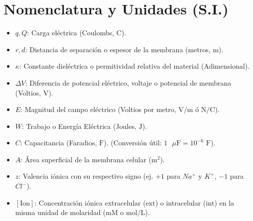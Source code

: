 \documentclass[11pt,letterpaper]{article}
\begin{document}
\section*{Nomenclatura y Unidades (S.I.)}
\begin{itemize}
    \item $q, Q$: Carga eléctrica (Coulombs, $\text{C}$).
    \item $r, d$: Distancia de separación o espesor de la membrana (metros, $\text{m}$).
    \item $\kappa$: Constante dieléctrica o permitividad relativa del material (Adimensional).
    \item $\Delta V$: Diferencia de potencial eléctrico, voltaje o potencial de membrana (Voltios, $\text{V}$).
    \item $E$: Magnitud del campo eléctrico (Voltios por metro, $\text{V/m}$ ó $\text{N/C}$).
    \item $W$: Trabajo o Energía Eléctrica (Joules, $\text{J}$).
    \item $C$: Capacitancia (Faradios, $\text{F}$). (Conversión útil: $1 \text{ }\mu\text{F} = 10^{-6} \text{ F}$).
    \item $A$: Área superficial de la membrana celular ($\text{m}^2$).
    \item $z$: Valencia iónica con su respectivo signo (ej. $+1$ para $Na^+$ y $K^+$, $-1$ para $Cl^-$).
    \item $[\text{Ion}]$: Concentración iónica extracelular ($\text{ext}$) o intracelular ($\text{int}$) en la misma unidad de molaridad ($\text{mM}$ o $\text{mol/L}$).
\end{itemize}
\end{document}
